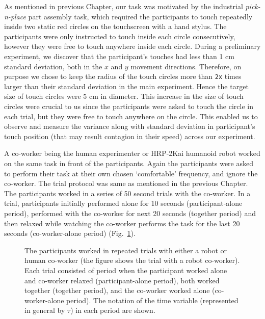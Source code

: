 As mentioned in previous Chapter, our task was motivated by the industrial \textit{pick-n-place} part assembly task, which required the participants to touch repeatedly inside two static red circles on the touchscreen with a hand stylus. The participants were only instructed to touch inside each circle consecutively, however they were free to touch anywhere inside each circle. During a preliminary experiment, we discover that the participant's touches had less than 1 cm standard deviation, both in the $x$ and $y$ movement directions. Therefore, on purpose we chose to keep the radius of the touch circles more than \texttt{2x} times larger than their standard deviation in the main experiment. Hence the target size of touch circles were 5 cm in diameter. This increase in the size of touch circles were crucial to us since the participants were asked to touch the circle in each trial, but they were free to touch anywhere on the circle. This enabled us to observe and measure the variance along with standard deviation in participant's touch position (that may result contagion in their speed) across our experiment.
 
A co-worker being the human experimenter or HRP-2Kai humanoid robot worked on the same task in front of the participants. Again the participants were asked to perform their task at their own chosen `comfortable' frequency, and ignore the co-worker. The trial protocol was same as mentioned in the previous Chapter. The participants worked in a series of 50 second trials with the co-worker. In a trial, participants initially performed alone for 10 seconds (participant-alone period), performed with the co-worker for next 20 seconds (together period) and then relaxed while watching the co-worker performs the task for the last 20 seconds (co-worker-alone period) (Fig.~\ref{fig:trialprotocol2}).   

\begin{figure}[hpt]
	\caption{The participants worked in repeated trials with either a robot or human co-worker (the figure shows the trial with a robot co-worker). Each trial consisted of period when the participant worked alone and co-worker relaxed (participant-alone period), both worked together (together period), and the co-worker worked alone (co-worker-alone period). The notation of the time variable (represented in general by $\tau$) in each period are shown.}
	\label{fig:trialprotocol2}
\end{figure}

